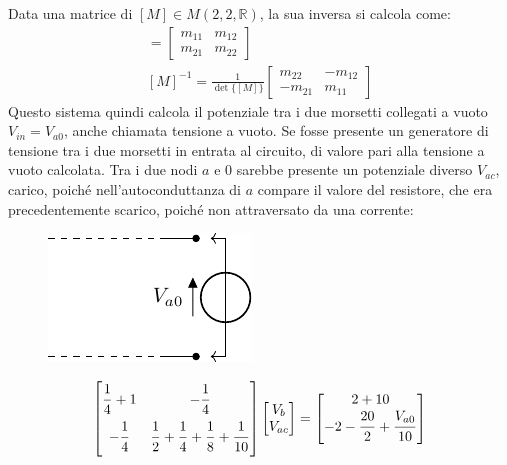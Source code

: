 \documentclass{article}
\numberwithin{equation}{subsection}
\begin{document}
Data una matrice di $[M]\in M(2,2,\mathbb{R})$, la sua inversa si calcola come:
\begin{gather*}
    [M]=\begin{bmatrix}
        m_{11}&m_{12}\\
        m_{21}&m_{22}
    \end{bmatrix}\\
    [M]^{-1}=\displaystyle\frac{1}{\det\{[M]\}}\begin{bmatrix}
        m_{22}&-m_{12}\\
        -m_{21}&m_{11}
    \end{bmatrix}
\end{gather*}
Questo sistema quindi calcola il potenziale tra i due morsetti collegati a vuoto $V_{in}=V_{a0}$, anche chiamata tensione a vuoto. 
Se fosse presente un generatore di tensione tra i due morsetti in entrata al circuito, di valore pari alla tensione a vuoto calcolata. Tra i due nodi $a$ e $0$ sarebbe 
presente un potenziale diverso $V_{ac}$, carico, poiché nell'autoconduttanza di $a$ compare il valore del resistore, che era precedentemente scarico, poiché non attraversato 
da una corrente: 
\begin{figure}[H]%
    \centering
    \includegraphics{generatore-tensione-entrata.pdf}
    \label{fig:generatore-tensione-entrata}
\end{figure}
\begin{gather*}
    \begin{bmatrix}
        \displaystyle\frac{\strut 1}{\strut 4}+1&-\displaystyle\frac{\strut 1}{\strut 4}\\
        \displaystyle-\frac{\strut 1}{\strut 4}&\displaystyle\frac{\strut 1}{\strut 2}+\frac{\strut 1}{\strut 4}+\frac{\strut 1}{\strut 8}+\frac{\strut 1}{\strut 10}
    \end{bmatrix}\begin{bmatrix}
        V_b\\
        V_{ac}
    \end{bmatrix}=\begin{bmatrix}
        2+10\\
        -2-\displaystyle\frac{\strut 20}{\strut 2}+\frac{\strut V_{a0}}{\strut 10}
    \end{bmatrix}
\end{gather*}
\end{document}
